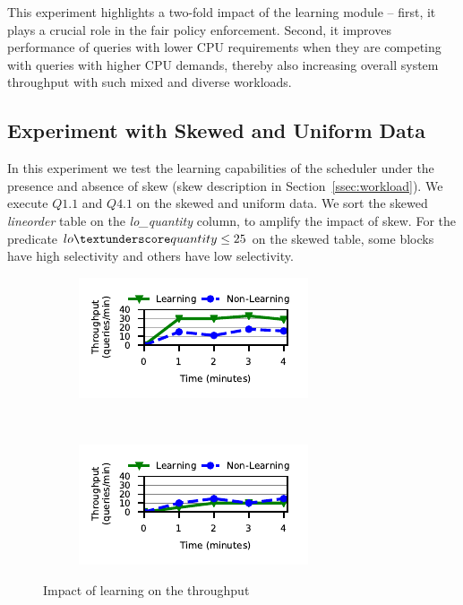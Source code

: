 This experiment highlights a two-fold impact of the learning module -- first, it plays a crucial role in the fair policy enforcement. 
Second, it improves performance of queries with lower CPU requirements when they are competing with queries with higher CPU demands, thereby also increasing overall system throughput with such mixed and diverse workloads. 

\subsection{Experiment with Skewed and Uniform Data}
In this experiment we test the learning capabilities of the \sys{} scheduler under the presence and absence of skew (skew description in Section~\ref{ssec:workload}).
We execute $Q1.1$ and $Q4.1$ on the skewed and uniform data.
We sort the skewed \textit{lineorder} table on the \textit{lo\_quantity} column, to amplify the impact of skew. 
For the predicate $lo\textunderscore quantity \leq 25$ on the skewed table, some blocks have high selectivity and others have low selectivity.


\begin{figure}[t]
	\centering
    \begin{subfigure}[b]{0.5\textwidth}
    	\includegraphics[width=\textwidth]{policy/figures/q11-throughput.pdf}
    \end{subfigure}%
    ~
    \begin{subfigure}[b]{0.5\textwidth}
    	\includegraphics[width=\textwidth]{policy/figures/q41-throughput.pdf}
    \end{subfigure}%
	\caption{Impact of learning on the throughput}
	\label{fig:q11-q41-throughput}
\end{figure}
	
